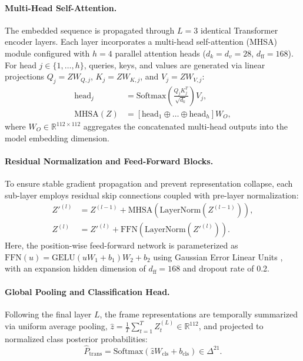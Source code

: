 \documentclass[runningheads]{llncs}
\begin{document}
\paragraph{Multi-Head Self-Attention.} The embedded sequence is propagated through $L = 3$ identical Transformer encoder layers. Each layer incorporates a multi-head self-attention (MHSA) module configured with $h = 4$ parallel attention heads ($d_k = d_v = 28$, $d_{\text{ff}} = 168$). For head $j \in \{1, \dots, h\}$, queries, keys, and values are generated via linear projections $Q_j = Z W_{Q, j}$, $K_j = Z W_{K, j}$, and $V_j = Z W_{V, j}$:
\begin{align}
    \mathrm{head}_j &= \mathrm{Softmax}\left( \frac{Q_j K_j^T}{\sqrt{d_k}} \right) V_j, \\
    \mathrm{MHSA}(Z) &= \left[ \mathrm{head}_1 \oplus \dots \oplus \mathrm{head}_h \right] W_O,
\end{align}
where $W_O \in \mathbb{R}^{112 \times 112}$ aggregates the concatenated multi-head outputs into the model embedding dimension.

\paragraph{Residual Normalization and Feed-Forward Blocks.} To ensure stable gradient propagation and prevent representation collapse, each sub-layer employs residual skip connections coupled with pre-layer normalization:
\begin{align}
    Z'^{(l)} &= Z^{(l-1)} + \mathrm{MHSA}\left(\mathrm{LayerNorm}(Z^{(l-1)})\right), \\
    Z^{(l)}  &= Z'^{(l)} + \mathrm{FFN}\left(\mathrm{LayerNorm}(Z'^{(l)})\right).
\end{align}
Here, the position-wise feed-forward network is parameterized as $\mathrm{FFN}(u) = \mathrm{GELU}(u W_1 + b_1) W_2 + b_2$ using Gaussian Error Linear Units \cite{hendrycks2016}, with an expansion hidden dimension of $d_{\text{ff}} = 168$ and dropout rate of 0.2.

\paragraph{Global Pooling and Classification Head.} Following the final layer $L$, the frame representations are temporally summarized via uniform average pooling, $\hat{z} = \frac{1}{T} \sum_{t=1}^T Z_t^{(L)} \in \mathbb{R}^{112}$, and projected to normalized class posterior probabilities:
\begin{equation}
    \hat{P}_{\text{trans}} = \mathrm{Softmax}\left( \hat{z} W_{\text{cls}} + b_{\text{cls}} \right) \in \Delta^{21}.
\end{equation}
\end{document}
